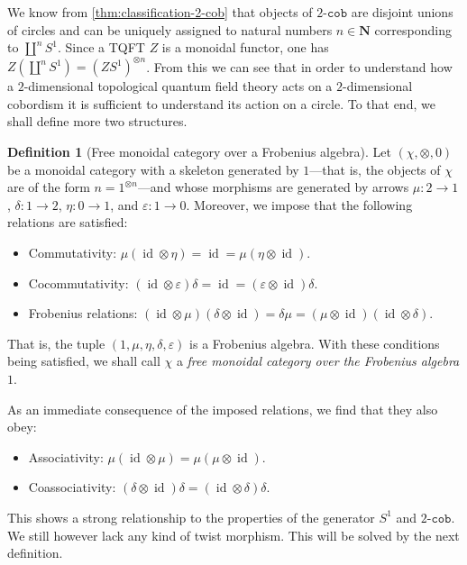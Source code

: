 \documentclass[11pt, reqno]{amsart}
\theoremstyle{definition}
\newtheorem{definition}[theorem]{Definition}
\newcommand{\disj}{\amalg}     %
\newcommand{\N}{\mathbf{N}}
\newcommand{\catfont}{\texttt}
\DeclareMathOperator{\Id}{id}     %
\newcommand{\Cob}[1]{{#1}\text{-}{\catfont{cob}}} %
\begin{document}
We know from \cref{thm:classification-2-cob} that objects of \(\Cob 2\) are
disjoint unions of circles and can be uniquely assigned to natural numbers
\(n \in \N\) corresponding to \(\disj^n S^1\). Since a TQFT \(Z\) is a
monoidal functor, one has
\(Z(\disj^n S^1) = (Z S^1)^{\otimes n}\). From this we can
see that in order to understand how a \(2\)-dimensional topological quantum
field theory acts on a \(2\)-dimensional cobordism it is sufficient to
understand its action on a circle. To that end, we shall define more two
structures.

\begin{definition}[Free monoidal category over a Frobenius algebra]
\label{def:free-monoidal-cat-over-frobenius-algebra}
Let \((\chi, \otimes, 0)\) be a monoidal category with a skeleton generated by
\(1\)---that is, the objects of \(\chi\) are of the form
\(n = 1^{\otimes n}\)---and whose morphisms are generated by arrows
\(\mu: 2 \to 1\), \(\delta: 1 \to 2\), \(\eta: 0 \to 1\), and
\(\varepsilon: 1 \to 0\). Moreover, we impose that the following relations are
satisfied:
\begin{itemize}\setlength\itemsep{0em}
\item Commutativity: \(\mu (\Id \otimes \eta) = \Id = \mu (\eta \otimes \Id)\).

\item Cocommutativity:
  \((\Id \otimes \varepsilon) \delta = \Id = (\varepsilon \otimes \Id) \delta\).

\item Frobenius relations:
  \((\Id \otimes \mu) (\delta \otimes \Id) = \delta \mu = (\mu \otimes \Id) (\Id
  \otimes \delta)\).
\end{itemize}
That is, the tuple \((1, \mu, \eta, \delta, \varepsilon)\) is a Frobenius
algebra. With these conditions being satisfied, we shall call \(\chi\) a
\emph{free monoidal category over the Frobenius algebra} \(1\).
\end{definition}

As an immediate consequence of the imposed relations, we find that they also obey:
\begin{itemize}\setlength\itemsep{0em}
\item Associativity: \(\mu (\Id \otimes \mu) = \mu (\mu \otimes \Id)\).
\item Coassociativity: \((\delta \otimes \Id) \delta = (\Id \otimes \delta) \delta\).
\end{itemize}
This shows a strong relationship to the properties of the generator \(S^1\) and
\(\Cob 2\). We still however lack any kind of twist morphism. This will be
solved by the next definition.
\end{document}
